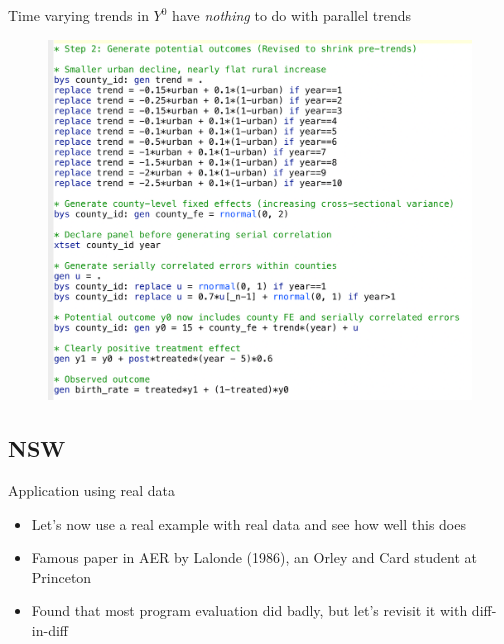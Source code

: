 \documentclass{beamer}
\begin{document}
\begin{frame}{Time varying trends in $Y^0$ have \emph{nothing} to do with parallel trends}

\begin{figure}
    \centering
    \includegraphics[height=0.75\textheight]{./lecture_includes/misleading_eventstudy_code}
\end{figure}

\end{frame}







\subsection{NSW}

\begin{frame}{Application using real data}

\begin{itemize}
\item Let's now use a real example with real data and see how well this does
\item Famous paper in AER by Lalonde (1986), an Orley and Card student at Princeton
\item Found that most program evaluation did badly, but let's revisit it with diff-in-diff
\end{itemize}

\end{frame}
\end{document}
